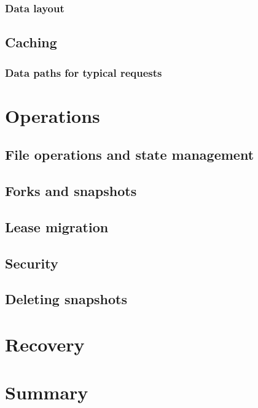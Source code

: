 \subsubsection{Data layout}

\subsection{Caching}
\subsubsection{Data paths for typical requests}

\section{Operations}
\subsection{File operations and state management}
\subsection{Forks and snapshots}
\subsection{Lease migration}
\subsection{Security}
\subsection{Deleting snapshots}

\section{Recovery}

\section{Summary}